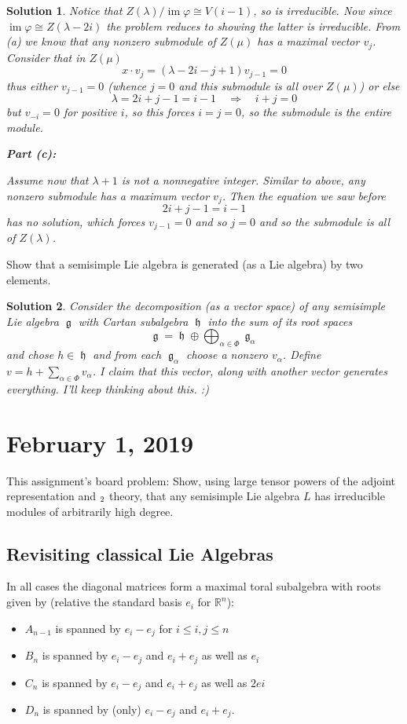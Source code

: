 \documentclass[12pt]{article}
\newenvironment{hwprob}[1]
{\renewcommand{\theprob}{#1}%
 \addtocounter{thm}{-1}%
 \begin{prob}}
{\end{prob}}
\theoremstyle{nonumberbreak}
\newtheorem{sol}{Solution}
\theoremstyle{changebreak}
\theoremstyle{nonumberbreak}
\theoremstyle{change}
\newcommand*{\R}{
\mathbb{R}
}
\DeclareMathOperator{\im}{im}
\let\sl\relax
\DeclareMathOperator{\sl}{\mathfrak{sl}}
\DeclareMathOperator{\h}{\mathfrak{h}}
\DeclareMathOperator{\g}{\mathfrak{g}}
\begin{document}
\begin{sol}
	Notice that $Z(\lambda)/\im\varphi\cong V(i-1)$, so is irreducible. Now since $\im\varphi\cong Z(\lambda-2i)$
	the problem reduces to showing the latter is irreducible. From (a) we know that any nonzero submodule of $Z(\mu)$ has a maximal vector $v_j$.
	Consider that in $Z(\mu)$
	\[x\cdot v_j=(\lambda-2i-j+1)v_{j-1}=0\]
	thus either $v_{j-1}=0$ (whence $j=0$ and this submodule is all over $Z(\mu)$) or else
	\[\lambda=2i+j-1=i-1\quad\Rightarrow\quad i+j=0\]
	but $v_{-i}=0$ for positive $i$, so this forces $i=j=0$, so the submodule is the entire module.

	\textbf{Part (c):}

	Assume now that $\lambda+1$ is not a nonnegative integer. Similar to above, any nonzero submodule has a maximum vector $v_j$.
	Then the equation we saw before
	\[2i+j-1=i-1\]
	has no solution, which forces $v_{j-1}=0$ and so $j=0$ and so the submodule is all of $Z(\lambda)$.
\end{sol}
\begin{hwprob}{(Board)}
	Show that a semisimple Lie algebra is generated (as a Lie algebra) by two elements.
\end{hwprob}
\begin{sol}
	Consider the decomposition (as a vector space) of any semisimple Lie algebra $\g$ with Cartan subalgebra $\h$ 
	into the sum of its root spaces
	\[\g = \h\oplus \bigoplus_{\alpha\in\Phi}\g_\alpha\]
	and chose $h\in\h$ and from each $\g_\alpha$ choose a nonzero $v_\alpha$. Define $v =h+\sum_{\alpha\in\Phi}v_\alpha$. I claim that 
	this vector, along with another vector generates everything. I'll keep thinking about this. :)
\end{sol}
\newpage

\section{February 1, 2019}
\begin{prob}
	This assignment's board problem: Show, using large tensor powers of the adjoint representation and $\sl_2$ theory,
	that any semisimple Lie algebra $L$ has irreducible modules of arbitrarily high degree.
\end{prob}

\subsection{Revisiting classical Lie Algebras}
In all cases the diagonal matrices form a maximal toral subalgebra with roots given by (relative the standard basis $e_i$ for $\R^n$):
\begin{itemize}
	\item $A_{n-1}$ is spanned by $e_i-e_j$ for $i\le i,j\le n$
	\item $B_{n}$ is spanned by $e_i-e_j$ and $e_i+e_j$ as well as $e_i$
	\item $C_{n}$ is spanned by $e_i-e_j$ and $e_i+e_j$ as well as $2ei$
	\item $D_{n}$ is spanned by (only) $e_i-e_j$ and $e_i+e_j$.
\end{itemize}
\end{document}
